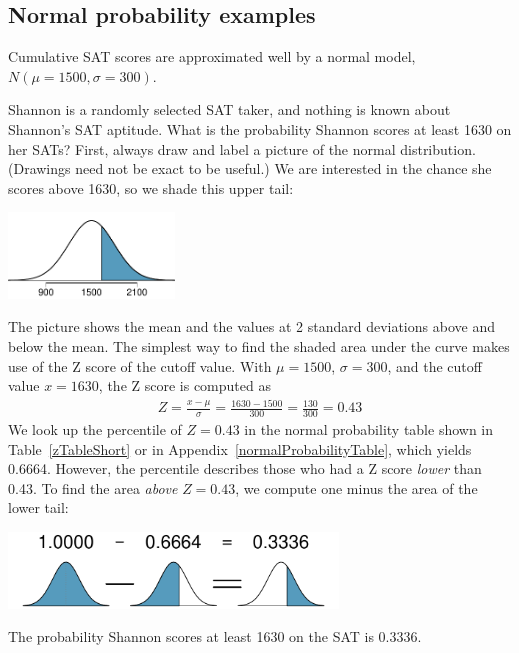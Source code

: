 \subsection{Normal probability examples}

Cumulative SAT scores are approximated well by a normal model, $N(\mu=1500, \sigma=300)$.

\begin{example}{Shannon is a randomly selected SAT taker, and nothing is known about Shannon's SAT aptitude. What is the probability Shannon scores at least 1630 on her SATs?}\label{satAbove1630Exam}
First, always draw and label a picture of the normal distribution. (Drawings need not be exact to be useful.) We are interested in the chance she scores above 1630, so we shade this upper tail:
\begin{center}
\includegraphics[height=0.9in]{02/figures/satAbove1630/satAbove1630}
\end{center}
The picture shows the mean and the values at 2 standard deviations above and below the mean. The simplest way to find the shaded area under the curve makes use of the Z score of the cutoff value. With $\mu=1500$, $\sigma=300$, and the cutoff value $x=1630$, the Z score is computed as
\begin{eqnarray*}
Z = \frac{x - \mu}{\sigma} = \frac{1630 - 1500}{300} = \frac{130}{300} = 0.43
\end{eqnarray*}
We look up the percentile of $Z=0.43$ in the normal probability table shown in Table~\ref{zTableShort} or in Appendix~\vref{normalProbabilityTable}, which yields 0.6664. However, the percentile describes those who had a Z score \emph{lower} than 0.43. To find the area \emph{above} $Z=0.43$, we compute one minus the area of the lower tail:
\begin{center}
\includegraphics[height=0.8in]{02/figures/subtractingArea/subtractingArea}
\end{center}
The probability Shannon scores at least 1630 on the SAT is 0.3336.
\end{example}

